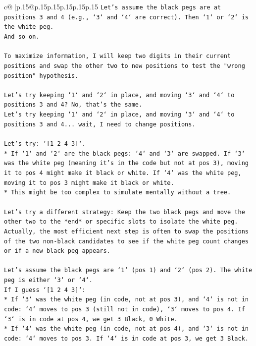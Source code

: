 \documentclass{article}
\begin{document}
{\begin{supertabular}{c@{$\;$}|p{.15\linewidth}@{}p{.15\linewidth}p{.15\linewidth}p{.15\linewidth}p{.15\linewidth}p{.15\linewidth}}
{{{\texttt{Let's assume the black pegs are at positions 3 and 4 (e.g., `3` and `4` are correct). Then `1` or `2` is the white peg.} \\
\texttt{And so on.} \\
\\ 
\texttt{To maximize information, I will keep two digits in their current positions and swap the other two to new positions to test the "wrong position" hypothesis.} \\
\\ 
\texttt{Let's try keeping `1` and `2` in place, and moving `3` and `4` to positions 3 and 4? No, that's the same.} \\
\texttt{Let's try keeping `1` and `2` in place, and moving `3` and `4` to positions 3 and 4... wait, I need to change positions.} \\
\\ 
\texttt{Let's try: `{[}1 2 4 3{]}`.} \\
\texttt{*   If `1` and `2` are the black pegs: `4` and `3` are swapped. If `3` was the white peg (meaning it's in the code but not at pos 3), moving it to pos 4 might make it black or white. If `4` was the white peg, moving it to pos 3 might make it black or white.} \\
\texttt{*   This might be too complex to simulate mentally without a tree.} \\
\\ 
\texttt{Let's try a different strategy: Keep the two black pegs and move the other two to the *end* or specific slots to isolate the white peg.} \\
\texttt{Actually, the most efficient next step is often to swap the positions of the two non{-}black candidates to see if the white peg count changes or if a new black peg appears.} \\
\\ 
\texttt{Let's assume the black pegs are `1` (pos 1) and `2` (pos 2). The white peg is either `3` or `4`.} \\
\texttt{If I guess `{[}1 2 4 3{]}`:} \\
\texttt{*   If `3` was the white peg (in code, not at pos 3), and `4` is not in code: `4` moves to pos 3 (still not in code), `3` moves to pos 4. If `3` is in code at pos 4, we get 3 Black, 0 White.} \\
\texttt{*   If `4` was the white peg (in code, not at pos 4), and `3` is not in code: `4` moves to pos 3. If `4` is in code at pos 3, we get 3 Black.} \\
\\ 
}}}
\end{supertabular}}
\end{document}

